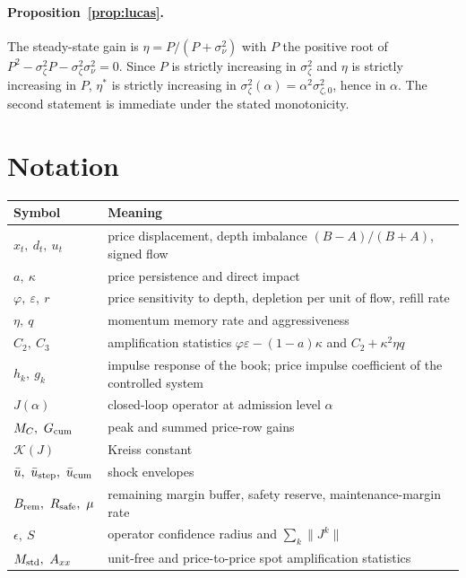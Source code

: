 \documentclass[12pt]{article}
\theoremstyle{definition}
\theoremstyle{remark}
\begin{document}
\paragraph{Proposition~\ref{prop:lucas}.} The steady-state gain is $\eta=P/(P+\sigma_\nu^2)$ with $P$ the positive root of $P^2-\sigma_\zeta^2P-\sigma_\zeta^2\sigma_\nu^2=0$. Since $P$ is strictly increasing in $\sigma_\zeta^2$ and $\eta$ is strictly increasing in $P$, $\eta^*$ is strictly increasing in $\sigma_\zeta^2(\alpha)=\alpha^2\sigma_{\zeta,0}^2$, hence in $\alpha$. The second statement is immediate under the stated monotonicity.

\section{Notation}\label{app:notation}
\begin{longtable}{p{}p{}}
\toprule
Symbol & Meaning\\
\midrule
\endhead
$x_t,\ d_t,\ u_t$ & price displacement, depth imbalance $(B-A)/(B+A)$, signed flow\\
$a,\ \kappa$ & price persistence and direct impact\\
$\varphi,\ \varepsilon,\ r$ & price sensitivity to depth, depletion per unit of flow, refill rate\\
$\eta,\ q$ & momentum memory rate and aggressiveness\\
$C_2,\ C_3$ & amplification statistics $\varphi\varepsilon-(1-a)\kappa$ and $C_2+\kappa^2\eta q$\\
$h_k,\ g_k$ & impulse response of the book; price impulse coefficient of the controlled system\\
$J(\alpha)$ & closed-loop operator at admission level $\alpha$\\
$M_C,\ G_{\rm cum}$ & peak and summed price-row gains\\
$\mathcal K(J)$ & Kreiss constant\\
$\bar u,\ \bar u_{\rm step},\ \bar u_{\rm cum}$ & shock envelopes\\
$B_{\rm rem},\ R_{\rm safe},\ \mu$ & remaining margin buffer, safety reserve, maintenance-margin rate\\
$\epsilon,\ S$ & operator confidence radius and $\sum_k\|J^k\|$\\
$M_{\rm std},\ A_{xx}$ & unit-free and price-to-price spot amplification statistics\\
\bottomrule
\end{longtable}
\end{document}
